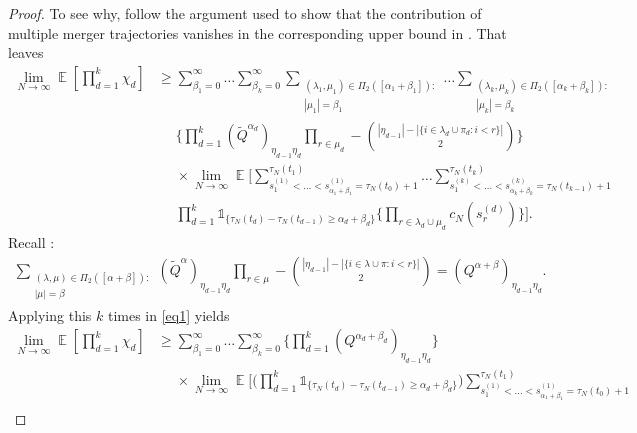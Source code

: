 \documentclass{article} %
\theoremstyle{definition}
\DeclareMathOperator{\E}{\mathbb{E}}
\newcommand{\1}[1]{\mathbbm{1}_{\{#1\}}}
\begin{document}
\begin{proof}
To see why, follow the argument used to show that the contribution of multiple merger trajectories vanishes in the corresponding upper bound in \cite{koskela2018}.
That leaves
\begin{align}
\lim_{ N \rightarrow \infty } \E\left[ \prod_{ d = 1 }^k \chi_d \right] 
&\geq \sum_{ \beta_1 = 0 }^{ \infty } \ldots \sum_{ \beta_k = 0 }^{ \infty } \sum_{\substack{ ( \lambda_1, \mu_1 ) \in \Pi_2( [ \alpha_1 + \beta_1 ] ) :\\ | \mu_1 | = \beta_1 }} \ldots \sum_{\substack{ ( \lambda_k, \mu_k ) \in \Pi_2( [ \alpha_k + \beta_k ] ) :\\ | \mu_k | = \beta_k }} \nonumber \\
&\phantom{\geq} \Bigg\{ \prod_{ d = 1 }^k ( \tilde{ Q }^{ \alpha_d } )_{ \eta_{ d - 1 } \eta_d } \prod_{ r \in \mu_d } - \binom{ | \eta_{ d - 1 } | - | \{ i \in \lambda_d \cup \pi_d : i < r \} | }{ 2 } \Bigg\} \nonumber \\
&\phantom{\geq} \times \lim_{ N \rightarrow \infty } \E\Bigg[ \sum_{ s_1^{ ( 1 ) } < \ldots < s_{ \alpha_1 + \beta_1 }^{ ( 1 ) } = \tau_N( t_0 ) + 1 }^{ \tau_N( t_1 ) } \ldots \sum_{ s_1^{ ( k ) } < \ldots < s_{ \alpha_k + \beta_k }^{ ( k ) } = \tau_N( t_{ k - 1 } ) + 1 }^{ \tau_N( t_k ) } \nonumber \\
&\phantom{\geq} \prod_{ d = 1 }^k \mathds{ 1 }_{ \{ \tau_N( t_d ) - \tau_N( t_{ d - 1 } ) \geq \alpha_d + \beta_d \} } \Bigg\{ \prod_{ r \in \lambda_d \cup \mu_d } c_N( s_r^{ ( d ) } ) \Bigg\} \Bigg]. \label{eq1}
\end{align}
Recall \cite[Eq (11)]{koskela2018}:
\begin{align*}
\sum_{\substack{ ( \lambda, \mu ) \in \Pi_2( [ \alpha + \beta ] ) :\\ | \mu | = \beta }} ( \tilde{ Q }^{ \alpha } )_{ \eta_{ d - 1 } \eta_d } \prod_{ r \in \mu } - \binom{ | \eta_{ d - 1 } | - | \{ i \in \lambda \cup \pi : i < r \} | }{ 2 } = ( Q^{ \alpha + \beta } )_{ \eta_{ d - 1 } \eta_d } .
\end{align*}
Applying this $k$ times in \eqref{eq1} yields
\begin{align*}
\lim_{ N \rightarrow \infty } \E\left[ \prod_{ d = 1 }^k \chi_d \right]
&\geq \sum_{ \beta_1 = 0 }^{ \infty } \ldots \sum_{ \beta_k = 0 }^{ \infty } \Bigg\{ \prod_{ d = 1 }^k ( Q^{ \alpha_d + \beta_d } )_{ \eta_{ d - 1 } \eta_d } \Bigg\} \\
&\phantom{\geq} \times \lim_{ N \rightarrow \infty } \E\Bigg[ \Bigg( \prod_{ d = 1 }^k \mathds{ 1 }_{ \{ \tau_N( t_d ) - \tau_N( t_{ d - 1 } ) \geq \alpha_d + \beta_d \} } \Bigg) \sum_{ s_1^{ ( 1 ) } < \ldots < s_{ \alpha_1 + \beta_1 }^{ ( 1 ) } = \tau_N( t_0 ) + 1 }^{ \tau_N( t_1 ) } \\

\end{align*}
\end{proof}
\end{document}
